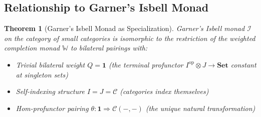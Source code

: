 \documentclass[11pt]{article}
\theoremstyle{plain}
\newtheorem{theorem}{Theorem}[section]
\theoremstyle{definition}
\theoremstyle{remark}
\newcommand{\C}{\mathcal{C}}
\newcommand{\op}{\mathrm{op}}
\begin{document}
\subsection{Relationship to Garner's Isbell Monad}

\begin{theorem}[Garner's Isbell Monad as Specialization]\label{thm:garner-specialization}
Garner's Isbell monad $\mathcal{I}$ on the category of small categories is isomorphic to the restriction of the weighted completion monad $\mathbb{W}$ to bilateral pairings with:
\begin{itemize}
\item Trivial bilateral weight $Q = \mathbf{1}$ (the terminal profunctor $I^{\op} \otimes J \to \mathbf{Set}$ constant at singleton sets)
\item Self-indexing structure $I = J = \C$ (categories index themselves)  
\item Hom-profunctor pairing $\theta : \mathbf{1} \Rightarrow \C(-, -)$ (the unique natural transformation)
\end{itemize}
\end{theorem}
\end{document}
